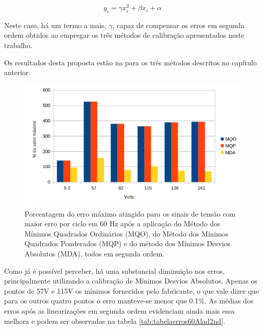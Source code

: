 \begin{equation}\label{eq:sec_order}
y_i = \gamma x_i^2 + \beta x_i + \alpha
\end{equation}

Neste caso, há um termo a mais, $\gamma$, capaz de compensar os erros em segunda ordem obtidos ao empregar os três métodos de calibração apresentados neste trabalho.  

Os resultados desta proposta estão na  para os três métodos descritos no capítulo anterior.

\begin{figure}
    \caption{Porcentagem do erro máximo atingido para os sinais de tensão com maior erro por ciclo em 60 Hz após a aplicação do Método dos Mínimos Quadrados Ordinários (MQO), do Método dos Mínimos Quadrados Ponderados (MQP) e do método dos Mínimos Desvios Absolutos (MDA), todos em segunda ordem.}
    \label{fig:res_volt2nd}
    \centering
    \includegraphics[width=0.9\linewidth]{pictures/max_err_V_aftercalib2nd.png}
\end{figure}

Como já é possível perceber, há uma substancial diminuição nos erros, principalmente utilizando a calibração de Mínimos Desvios Absolutos. Apenas os pontos de 57V e 115V os mínimos fornecidos pelo fabricante, o que vale dizer que para os outros quatro pontos o erro manteve-se menor que 0.1$\%$. As médias dos erros após as linearizações em segunda ordem evidenciam ainda mais essa melhora e podem ser observadas na tabela \ref{tab:tabelaerros60Alad2nd}.

